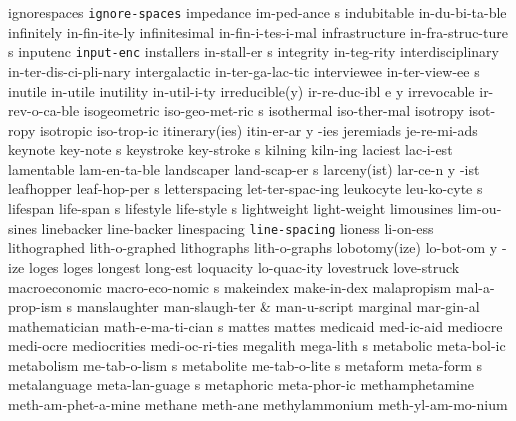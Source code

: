 \1 ignorespaces 	{\tt\bs ignore-spaces}
\5 impedance		im-ped-ance s
\1 indubitable		in-du-bi-ta-ble		%
\1 infinitely		in-fin-ite-ly
\1 infinitesimal	in-fin-i-tes-i-mal
\5 infrastructure	in-fra-struc-ture s
\NewWordtrue
\1 inputenc		{\tt input-enc}		%
\5 installers		in-stall-er s		%
\1 integrity		in-teg-rity		%
\1 interdisciplinary	in-ter-dis-ci-pli-nary
\1 intergalactic	in-ter-ga-lac-tic
\NewWordtrue
\5 interviewee		in-ter-view-ee s	%
\1 inutile		in-utile
\1 inutility		in-util-i-ty
\3 irreducible(y)       ir-re-duc-ibl e y       %
\1 irrevocable		ir-rev-o-ca-ble
\5 isogeometric		iso-geo-met-ric s	%
\1 isothermal		iso-ther-mal		%
\1 isotropy		isot-ropy		%
\1 isotropic		iso-trop-ic		%
\3 itinerary(ies)	itin-er-ar y -ies
\1 jeremiads		je-re-mi-ads
\5 keynote		key-note s		%
\5 keystroke		key-stroke s
\1 kilning		kiln-ing
\1 laciest		lac-i-est
\1 lamentable		lam-en-ta-ble
\5 landscaper		land-scap-er s
\3 larceny(ist) 	lar-ce-n y -ist
\5 leafhopper		leaf-hop-per s	%
\1 letterspacing	let-ter-spac-ing
\NewWordtrue
\5 leukocyte	 	leu-ko-cyte s 		%
\5 lifespan		life-span s
\5 lifestyle		life-style s            %
\1 lightweight		light-weight
\1 limousines		lim-ou-sines
\1 linebacker		line-backer
\1 linespacing		{\tt\bs line-spacing}
\1 lioness		li-on-ess            %
\1 lithographed		lith-o-graphed
\1 lithographs		lith-o-graphs
\3 lobotomy(ize)	lo-bot-om y -ize
\1 loges		loges
\1 longest		long-est
\1 loquacity		lo-quac-ity          %
\1 lovestruck           love-struck          %
\5 macroeconomic	macro-eco-nomic s
\1 makeindex		make-in-dex		%
\5 malapropism		mal-a-prop-ism s
\1 manslaughter		man-slaugh-ter		%
 & man-u-script \cr
\1 marginal		mar-gin-al
\5 mathematician	math-e-ma-ti-cian s
\1 mattes		mattes
\1 medicaid		med-ic-aid
\1 mediocre		medi-ocre
\1 mediocrities		medi-oc-ri-ties
\5 megalith		mega-lith s
\1 metabolic		meta-bol-ic
\5 metabolism		me-tab-o-lism s
\5 metabolite		me-tab-o-lite s
\NewWordtrue
\5 metaform		meta-form s		%
\5 metalanguage		meta-lan-guage s
\1 metaphoric		meta-phor-ic		%
\NewWordtrue
\1 methamphetamine	meth-am-phet-a-mine	%
\1 methane		meth-ane		%
\NewWordtrue
\1 methylammonium	meth-yl-am-mo-nium	%
